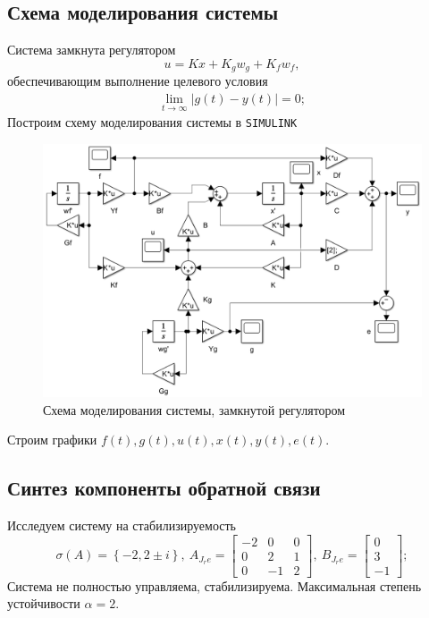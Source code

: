 \documentclass[a4paper, 12pt]{article}
\begin{document}
    \subsection{Схема моделирования системы}
    Система замкнута регулятором
    $$
    u=Kx+K_gw_g+K_fw_f,
    $$
    обеспечивающим выполнение целевого условия
    \begin{align}
    \lim\limits_{t\to\infty}|g(t)-y(t)|=0;\label{eq:aim}
    \end{align}
    Построим схему моделирования системы в \texttt{SIMULINK}
    \begin{figure}[H]
        \centering
        \includegraphics[scale=0.5]{1task_scheme.png}
        \captionsetup{skip=0pt}
        \caption{Схема моделирования системы, замкнутой регулятором}
        \label{fig:1task_scheme}
    \end{figure}
    \noindent Строим графики $f(t),g(t),u(t),x(t),y(t),e(t)$.


    \subsection{Синтез компоненты обратной связи}
    Исследуем систему на стабилизируемость
    $$
    \sigma\left( A \right)=\left\{ -2,2\pm i \right\},\ A_{J_re}=\begin{bmatrix}
        -2 &0 &0\\
        0 &2 &1\\
        0 &-1 &2
    \end{bmatrix},\ B_{J_re}=\begin{bmatrix}
        0\\3\\-1
    \end{bmatrix};
    $$
    Система не полностью управляема, стабилизируема. Максимальная степень
    устойчивости $\alpha=2$.
\end{document}
